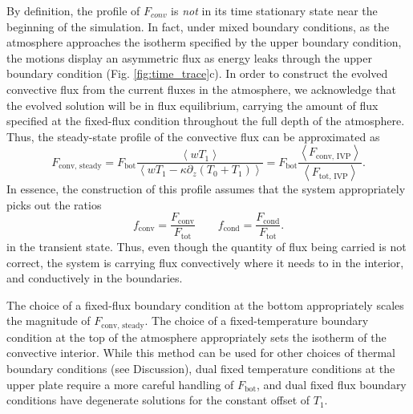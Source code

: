 \documentclass[aps, pre, onecolumn, nofootinbib, notitlepage, groupedaddress, amsfonts, amssymb, amsmath, longbibliography]{revtex4-1}
\newcommand{\angles}[1]{\ensuremath{\left\langle #1 \right\rangle}}
\begin{document}
By definition, the profile of $F_{conv}$ is \emph{not} in its time stationary state near the
beginning of the simulation.  In fact, under mixed boundary conditions, as the atmosphere approaches the
isotherm specified by the upper boundary condition, the motions display an asymmetric flux as energy
leaks through the upper boundary condition (Fig. \ref{fig:time_trace}c).  
In order to construct the evolved convective flux from the current fluxes in the atmosphere,
we acknowledge that the evolved solution will be in flux equilibrium, 
carrying the amount of flux specified at the fixed-flux condition throughout the full depth of the atmosphere.  
Thus, the steady-state profile of the convective flux can be approximated as
\begin{equation}
F_{\text{conv, steady}} = F_{\text{bot}}\frac{\angles{wT_1}}{\angles{wT_1 - \kappa \partial_z (T_0 + T_1)}}
= F_{\text{bot}}\frac{\angles{F_{\text{conv, IVP}}}}{\angles{F_{\text{tot, IVP}}}}.
\label{eqn:bouss_BVP_fconv}
\end{equation}
In essence, the construction of this profile assumes that the system appropriately picks out the ratios
\begin{equation}
f_{\text{conv}} = \frac{F_{\text{conv}}}{F_{\text{tot}}}\qquad
f_{\text{cond}} = \frac{F_{\text{cond}}}{F_{\text{tot}}}.
\end{equation}
in the transient state.  Thus, even though the quantity of flux being carried is not correct, the
system is carrying flux convectively where it needs to in the interior, and conductively in the boundaries.

The choice of a fixed-flux boundary condition at the bottom appropriately scales the magnitude of
$F_{\text{conv, steady}}$.  The choice of a fixed-temperature boundary condition at the top of the
atmosphere appropriately sets the isotherm of the convective interior.  While this method can be used
for other choices of thermal boundary conditions (see Discussion), dual fixed temperature conditions
at the upper plate require a more careful handling of $F_{\text{bot}}$, and dual fixed flux boundary
conditions have degenerate solutions for the constant offset of $T_1$.
\end{document}
